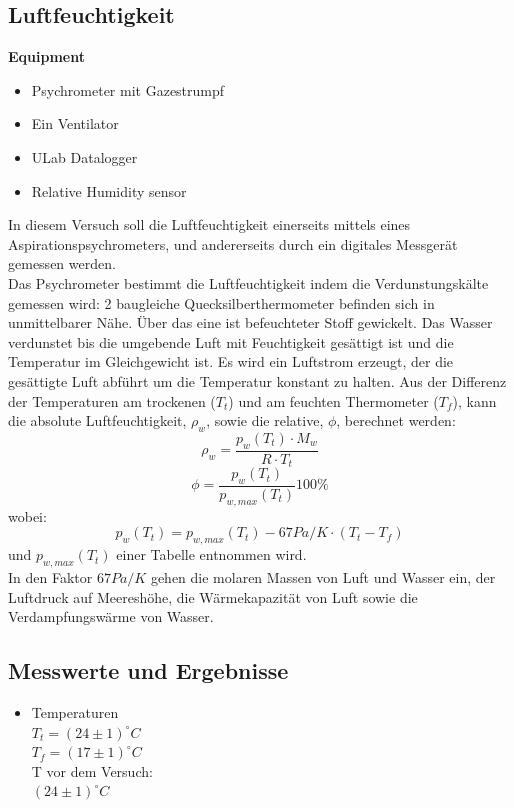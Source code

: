 \documentclass[12pt,a4paper]{article}
\begin{document}
\begin{multicols}{2}
\section{Luftfeuchtigkeit}
\textbf{Equipment}
\begin{itemize}
	\item Psychrometer mit Gazestrumpf
	\item Ein Ventilator
	\item ULab Datalogger
	\item Relative Humidity sensor
\end{itemize}

\noindent In diesem Versuch soll die Luftfeuchtigkeit einerseits mittels eines Aspirationspsychrometers, und andererseits durch ein digitales Messgerät gemessen werden.\\
Das Psychrometer bestimmt die Luftfeuchtigkeit indem die Verdunstungskälte gemessen wird: 2 baugleiche Quecksilberthermometer befinden sich in unmittelbarer Nähe. Über das eine ist befeuchteter Stoff gewickelt. Das Wasser verdunstet bis die umgebende Luft mit Feuchtigkeit gesättigt ist und die Temperatur im Gleichgewicht ist. Es wird ein Luftstrom erzeugt, der die gesättigte Luft abführt um die Temperatur konstant zu halten. Aus der Differenz der Temperaturen am trockenen ($T_t$) und am feuchten Thermometer ($T_f$), kann die absolute Luftfeuchtigkeit, $\rho_w$, sowie die relative, $\phi$, berechnet werden:\\
$$\rho_w=\frac{p_w(T_t)\cdot M_w}{R \cdot T_t}$$
$$\phi= \frac{p_w(T_t)}{p_{w,max}(T_t)}100\%$$
wobei:
$$p_w(T_t)=p_{w,max}(T_t)-67 Pa/K \cdot (T_t-T_f)$$
und $p_{w,max}(T_t)$ einer Tabelle entnommen wird.\\
In den Faktor $67Pa/K$ gehen die molaren Massen von Luft und Wasser ein, der Luftdruck auf Meereshöhe, die Wärmekapazität von Luft sowie die Verdampfungswärme von Wasser.

\subsection{Messwerte und Ergebnisse}
\begin {itemize}
	\item Temperaturen\\
	$T_{t} = (24 \pm 1)^{\circ}C$\\
	$T_{f} = (17 \pm 1)^{\circ}C$\\
	T vor dem Versuch:\\
	$(24 \pm 1)^{\circ}C$\\
\end{itemize}


\end{multicols}
\end{document}
